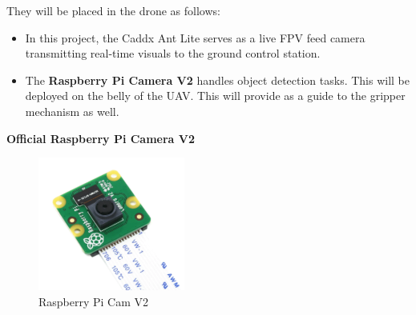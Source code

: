 \documentclass[12pt]{report}
\begin{document}
      \noindent They will be placed in the drone as follows: 
      \begin{itemize}
        \item In this project, the Caddx Ant Lite serves as a live FPV feed camera transmitting real-time visuals to the ground control station.
        \item The \textbf{Raspberry Pi Camera V2} handles object detection tasks. This will be deployed on the belly of the UAV. This will provide as a guide to the gripper mechanism as well. 
      \end{itemize}

      \newpage
      \noindent \textbf{\large Official Raspberry Pi Camera V2} \\
      \begin{figure}
          \includegraphics[width=1\linewidth]{rpicam.png}
          \caption{Raspberry Pi Cam V2}
          \label{fig:rpicam}
        \end{figure}
\end{document}
